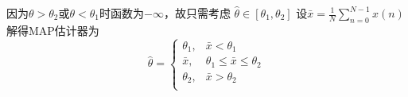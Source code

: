 \documentclass{article}
\begin{document}
\begin{enumerate}
\begin{solution}
因为$\theta>\theta_2$或$\theta<\theta_1$时函数为$-\infty$，故只需考虑 $\hat{\theta}\in [\theta_1,\theta_2]$
设$\bar{x}=\frac{1}{N}\displaystyle\sum_{n=0}^{N-1} x(n)$
解得MAP估计器为
\begin{equation}
\hat{\theta}=\begin{cases}
\theta_1,& \bar{x} <\theta_1\\
\bar{x},& \theta_1\leq \bar{x}\leq \theta_2\\
\theta_2,& \bar{x} >\theta_2\\
\end{cases}
\end{equation}
\end{solution}
\end{enumerate}
\end{document}
